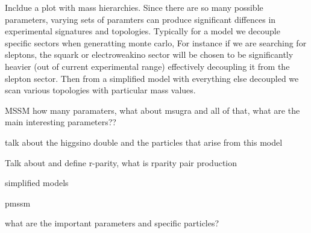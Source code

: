 Incldue a plot with mass hierarchies. Since there are so many possible parameters, varying sets of paramters can produce significant diffences in experimental signatures and topologies. Typically for a model we decouple specific sectors when generatting monte carlo, For instance if we are searching for sleptons, the squark or electroweakino sector will be chosen to be significantly heavier (out of current experimental range) effectively decoupling it from the slepton sector. Then from a simplified model with everything else decoupled we scan various topologies with particular mass values. 

MSSM how many paramaters, what about msugra and all of that, what are the main interesting parameters??


talk about the higgsino double and the particles that arise from this model

Talk about and define r-parity, what is rparity pair production


simplified models

pmssm

what are the important parameters and specific particles?

